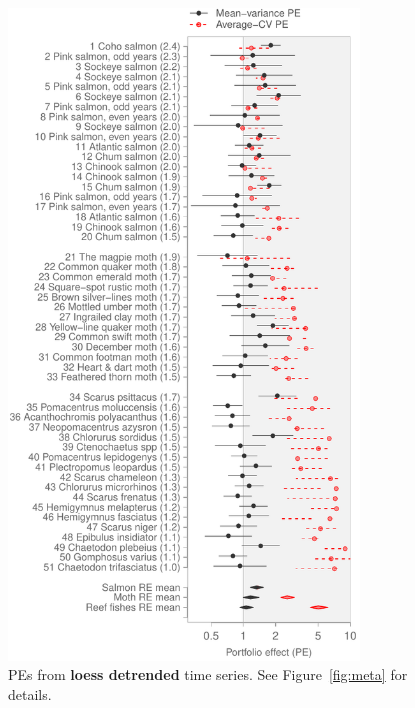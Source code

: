 \begin{figure}[htbp]
  \centering
  \includegraphics[height=6.8in]{prophets/PE_comparison_z_meta_loess_detrend_taxa_20121214.pdf}
  \caption{PEs from \textbf{loess detrended} time series. See
    Figure~\ref{fig:meta} for details.
}
\label{fig:meta-detrend-loess}
\end{figure}
\clearpage

